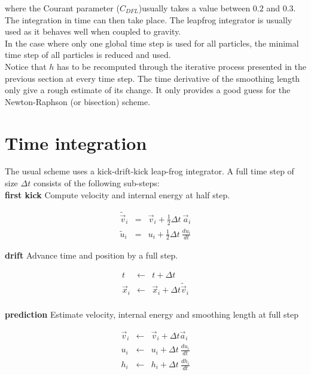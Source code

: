 \documentclass[a4paper,10pt]{article}
\begin{document}
where the Courant parameter ($C_{DFL}$)usually takes a value between $0.2$ and $0.3$. The integration in time can then
take place. The
leapfrog integrator is usually used as it behaves well when coupled to gravity. \\
In the case where only one global time step is used for all particles, the minimal time step of all particles is reduced
and used. \\

Notice that $h$ has to be recomputed through the iterative process
presented in the previous section at every time step. The time
derivative of the smoothing length only give a rough estimate of its
change. It only provides a good guess for the Newton-Raphson (or
bisection) scheme.

\section{Time integration}

The usual scheme uses a kick-drift-kick leap-frog integrator. A full time step of size $\Delta t$ consists of the
following sub-steps: \\

\textbf{first kick} Compute velocity and internal energy at half step.

\begin{eqnarray*}
 \tilde {\vec{v}}_i &=& \vec{v}_i + \textstyle\frac{1}{2}\Delta t ~\vec{a}_i \\
 \tilde u_i &=& u_i + \textstyle\frac{1}{2}\Delta t ~\frac{du_i}{dt}
\end{eqnarray*}

\textbf{drift} Advance time and position by a full step.

\begin{eqnarray*}
 t &\leftarrow& t + \Delta t \\
 \vec{x}_i &\leftarrow& \vec{x}_i + \Delta t \tilde {\vec{v}}_i\\
\end{eqnarray*}

\textbf{prediction} Estimate velocity, internal energy and smoothing length at full step

\begin{eqnarray*}
\vec{v}_i &\leftarrow& \vec{v}_i + \Delta t \vec{a}_i \\
u_i &\leftarrow& u_i + \Delta t ~\frac{du_i}{dt} \\
h_i &\leftarrow& h_i + \Delta t ~\frac{dh_i}{dt} \\
\end{eqnarray*}
\end{document}
